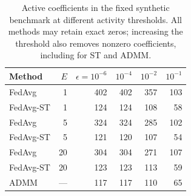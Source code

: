 \begin{table}[htbp]\centering\small
\caption{Active coefficients in the fixed synthetic benchmark at different activity thresholds. All methods may retain exact zeros; increasing the threshold also removes nonzero coefficients, including for ST and ADMM.}
\label{tab:eps}\begin{tabular}{lrrrrr}\toprule
Method & $E$ & $\epsilon=10^{-6}$ & $10^{-4}$ & $10^{-2}$ & $10^{-1}$ \\\midrule
FedAvg & 1 & 402 & 402 & 357 & 103 \\
FedAvg-ST & 1 & 124 & 124 & 108 & 58 \\
FedAvg & 5 & 324 & 324 & 285 & 102 \\
FedAvg-ST & 5 & 121 & 120 & 107 & 54 \\
FedAvg & 20 & 304 & 304 & 271 & 107 \\
FedAvg-ST & 20 & 123 & 123 & 113 & 59 \\
ADMM & --- & 117 & 117 & 110 & 65 \\
\bottomrule\end{tabular}\end{table}
